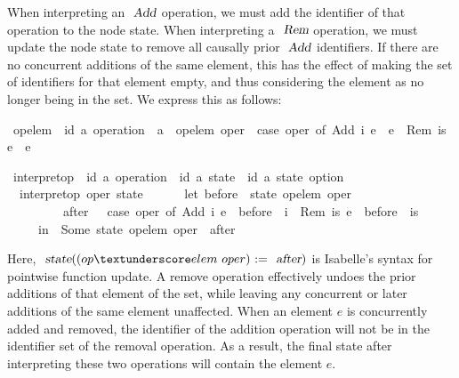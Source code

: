 When interpreting an $\isa{Add}$ operation, we must add the identifier of that operation to the node state.
When interpreting a $\isa{Rem}$ operation, we must update the node state to remove all causally prior $\isa{Add}$ identifiers.
If there are no concurrent additions of the same element, this has the effect of making the set of identifiers for that element empty, and thus considering the element as no longer being in the set.
We express this as follows:
\begin{isabelle}
\ op{\isacharunderscore}elem\ {\isacharcolon}{\isacharcolon}\ {\isachardoublequoteopen}{\isacharparenleft}{\isacharprime}id{\isacharcomma}\ {\isacharprime}a{\isacharparenright}\ operation\ {\isasymRightarrow}\ {\isacharprime}a{\isachardoublequoteclose}\ \ {\isachardoublequoteopen}op{\isacharunderscore}elem\ oper\ {\isasymequiv}\ case\ oper\ of\ Add\ i\ e\ {\isasymRightarrow}\ e\ {\isacharbar}\ Rem\ is\ e\ {\isasymRightarrow}\ e{\isachardoublequoteclose}
\end{isabelle}
\begin{isabelle}
\ interpret{\isacharunderscore}op\ {\isacharcolon}{\isacharcolon}\ {\isachardoublequoteopen}{\isacharparenleft}{\isacharprime}id{\isacharcomma}\ {\isacharprime}a{\isacharparenright}\ operation\ {\isasymRightarrow}\ {\isacharparenleft}{\isacharprime}id{\isacharcomma}\ {\isacharprime}a{\isacharparenright}\ state\ {\isasymRightarrow}\ {\isacharparenleft}{\isacharprime}id{\isacharcomma}\ {\isacharprime}a{\isacharparenright}\ state\ option{\isachardoublequoteclose}\ \isanewline
\ \ {\isachardoublequoteopen}interpret{\isacharunderscore}op\ oper\ state\ {\isasymequiv}\isanewline
\ \ \ \ \ let\ before\ {\isacharequal}\ state\ {\isacharparenleft}op{\isacharunderscore}elem\ oper{\isacharparenright}{\isacharsemicolon}\isanewline
\ \ \ \ \ \ \ \ \ after\ \ {\isacharequal}\ case\ oper\ of\ Add\ i\ e\ {\isasymRightarrow}\ before\ {\isasymunion}\ {\isacharbraceleft}i{\isacharbraceright}\ {\isacharbar}\ Rem\ is\ e\ {\isasymRightarrow}\ before\ {\isacharminus}\ is\isanewline
\ \ \ \ \ in\ \ Some\ {\isacharparenleft}state\ {\isacharparenleft}{\isacharparenleft}op{\isacharunderscore}elem\ oper{\isacharparenright}\ {\isacharcolon}{\isacharequal}\ after{\isacharparenright}{\isacharparenright}{\isachardoublequoteclose}
\end{isabelle}
Here, $\isa{state}{\isacharparenleft}{\isacharparenleft}op{\isacharunderscore}elem\ oper{\isacharparenright}\ {\isacharcolon}{\isacharequal}\ \isa{after}{\isacharparenright}$ is Isabelle's syntax for pointwise function update.
A remove operation effectively undoes the prior additions of that element of the set, while leaving any concurrent or later additions of the same element unaffected.
When an element $e$ is concurrently added and removed, the identifier of the addition operation will not be in the identifier set of the removal operation.
As a result, the final state after interpreting these two operations will contain the element $e$.

